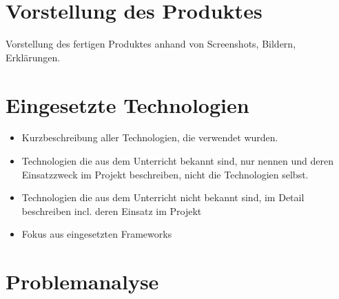 \chapter{Vorstellung des Produktes}
Vorstellung des fertigen Produktes anhand von Screenshots, Bildern, Erklärungen.

\chapter{Eingesetzte Technologien}
\begin{itemize}
	\item Kurzbeschreibung aller Technologien, die verwendet wurden.
	\item Technologien die aus dem Unterricht bekannt sind, nur nennen und deren  Einsatzzweck im Projekt beschreiben, nicht die Technologien selbst.
	\item Technologien die aus dem Unterricht nicht bekannt sind, im Detail beschreiben incl. deren Einsatz im Projekt
	\item Fokus aus eingesetzten Frameworks
\end{itemize}

\chapter{Problemanalyse}
